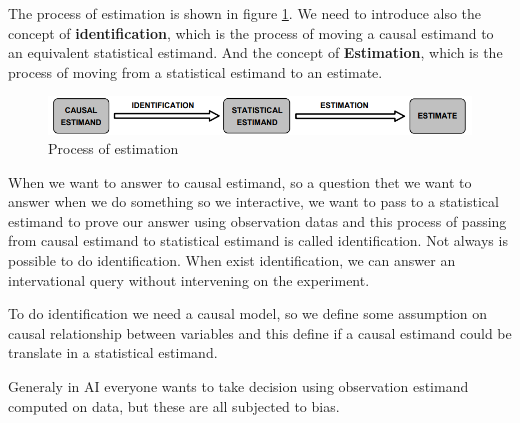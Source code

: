 The process of estimation is shown in figure \ref{fig:pipeline}. We need to
introduce also the concept of \textbf{identification}, which is the process of
moving a causal estimand to an equivalent statistical estimand. And the concept
of \textbf{Estimation}, which is the process of moving from a statistical estimand
to an estimate.
\begin{figure}[!ht]
    \centering
    \includegraphics[width=\textwidth]{img/process.png}
    \caption{Process of estimation}
    \label{fig:pipeline}
\end{figure}

When we want to answer to causal estimand, so a question thet we want to answer when 
we do something so we interactive, we want to pass to a statistical estimand 
to prove our answer using observation datas and this process of passing from causal 
estimand to statistical estimand is called identification. Not always is possible 
to do identification. When exist identification, we can answer an intervational query
without intervening on the experiment.

To do identification we need a causal model, so we define some assumption on causal 
relationship between variables and this define if a causal estimand could be translate 
in a statistical estimand. 

Generaly in AI everyone wants to take decision using observation estimand computed 
on data, but these are all subjected to bias.
